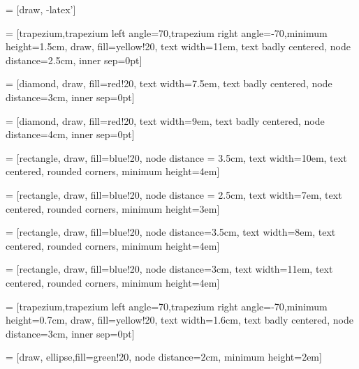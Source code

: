 
 = [draw, -latex']

 = [trapezium,trapezium left angle=70,trapezium right angle=-70,minimum height=1.5cm, draw, fill=yellow!20, text width=11em, text badly centered, node distance=2.5cm, inner sep=0pt]

 = [diamond, draw, fill=red!20, 
    text width=7.5em, text badly centered, node distance=3cm, inner sep=0pt]

 = [diamond, draw, fill=red!20, 
    text width=9em, text badly centered, node distance=4cm, inner sep=0pt]

 = [rectangle, draw, fill=blue!20, node distance = 3.5cm, text width=10em, text centered, rounded corners, minimum height=4em]

 = [rectangle, draw, fill=blue!20, node distance = 2.5cm,
    text width=7em, text centered, rounded corners, minimum height=3em]

 = [rectangle, draw, fill=blue!20, node distance=3.5cm,
    text width=8em, text centered, rounded corners, minimum height=4em]

 = [rectangle, draw, fill=blue!20, node distance=3cm,
    text width=11em, text centered, rounded corners, minimum height=4em]

 = [trapezium,trapezium left angle=70,trapezium right angle=-70,minimum height=0.7cm, draw, fill=yellow!20, text width=1.6cm, text badly centered, node distance=3cm, inner sep=0pt]

 = [draw, ellipse,fill=green!20, node distance=2cm,
    minimum height=2em]
    
